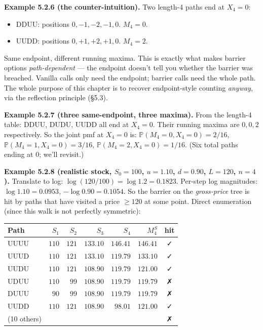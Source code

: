 \documentclass[
  10pt,
  twoside]{book}
\newcounter{none} %
\providecommand{\tightlist}{%
  \setlength{\itemsep}{0pt}\setlength{\parskip}{0pt}}
\begin{document}
\textbf{Example 5.2.6 (the counter-intuition).} Two length-4 paths end
at \(X_4 = 0\):

\begin{itemize}
\tightlist
\item
  DDUU: positions \(0, -1, -2, -1, 0\). \(M_4 = 0\).
\item
  UUDD: positions \(0, +1, +2, +1, 0\). \(M_4 = 2\).
\end{itemize}

Same endpoint, different running maxima. This is exactly what makes
barrier options \emph{path-dependent} --- the endpoint doesn't tell you
whether the barrier was breached. Vanilla calls only need the endpoint;
barrier calls need the whole path. The whole purpose of this chapter is
to recover endpoint-style counting \emph{anyway}, via the reflection
principle (§5.3).

\textbf{Example 5.2.7 (three same-endpoint, three maxima).} From the
length-4 table: DDUU, DUDU, UUDD all end at \(X_4 = 0\). Their running
maxima are \(0, 0, 2\) respectively. So the joint pmf at \(X_4 = 0\) is:
\(\mathbb P(M_4 = 0, X_4 = 0) = 2/16\),
\(\mathbb P(M_4 = 1, X_4 = 0) = 3/16\),
\(\mathbb P(M_4 = 2, X_4 = 0) = 1/16\). (Six total paths ending at 0;
we'll revisit.)

\textbf{Example 5.2.8 (realistic stock, \(S_0 = 100\), \(u = 1.10\),
\(d = 0.90\), \(L = 120\), \(n = 4\)).} Translate to log:
\(\log(120/100) = \log 1.2 = 0.1823\). Per-step log magnitudes:
\(\log 1.10 = 0.0953\), \(-\log 0.90 = 0.1054\). So the barrier on the
\emph{gross-price} tree is hit by paths that have visited a price
\(\ge 120\) at some point. Direct enumeration (since this walk is not
perfectly symmetric):

{\def\LTcaptype{none} %
\begin{table}[H]
\centering
\begin{tabular}{|l|r|r|r|r|r|c|}
\toprule
Path & \(S_1\) & \(S_2\) & \(S_3\) & \(S_4\) & \(M^S_4\) & hit \\
\midrule



UUUU & \(110\) & \(121\) & \(133.10\) & \(146.41\) & \(146.41\) & ✓ \\
UUUD & \(110\) & \(121\) & \(133.10\) & \(119.79\) & \(133.10\) & ✓ \\
UUDU & \(110\) & \(121\) & \(108.90\) & \(119.79\) & \(121.00\) & ✓ \\
UDUU & \(110\) & \(99\) & \(108.90\) & \(119.79\) & \(119.79\) & ✗ \\
DUUU & \(90\) & \(99\) & \(108.90\) & \(119.79\) & \(119.79\) & ✗ \\
UUDD & \(110\) & \(121\) & \(108.90\) & \(98.01\) & \(121.00\) & ✓ \\
(10 others) & & & & & & ✗ \\
\bottomrule
\end{tabular}
\end{table}
}
\end{document}

